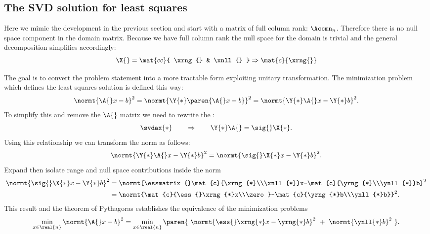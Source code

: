 \documentclass[10pt]{newsiambook}
\begin{document}
\subsection{The SVD solution for least squares}
Here we mimic the development in the previous section and start with a matrix of full column rank: $\Accmn_{n}$. Therefore there is no null space component in the domain matrix. Because we have full column rank the null space for the domain is trivial and the general decomposition simplifies accordingly:
\begin{equation}
  \X{} = \mat{cc}{ \xrng{} & \xnll{} } \Rightarrow \mat{c}{ \xrng{} }
\end{equation}

The goal is to convert the problem statement into a more tractable form exploiting unitary transformation. The minimization problem which defines the least squares solution is defined this way:
\begin{equation}
  \normt{\A{}x-b}^{2} = \normt{\Y{*}\paren{ \A{}x-b }}^{2} = \normt{\Y{*}\A{}x-\Y{*}b}^{2}.
\end{equation}
To simplify this and remove the $\A{}$ matrix we need to rewrite the \svdl:
\begin{equation}
  \svdax{*} \qquad \Rightarrow \qquad \Y{*}\A{} = \sig{}\X{*}.
\end{equation}
Using this relationship we can transform the norm as follows:
\begin{equation}
  \normt{\Y{*}\A{}x-\Y{*}b}^{2} = \normt{\sig{}\X{*}x-\Y{*}b}^{2}.
\end{equation}
%
Expand then isolate range and null space contributions inside the norm
\begin{equation}
\begin{split}
  \normt{\sig{}\X{*}x-\Y{*}b}^{2} 
    &= \normt{\essmatrix{}\mat{c}{\xrng{*}\\\xnll{*}}x-\mat{c}{\yrng{*}\\\ynll{*}}b}^{2} \\
    &= \normt{\mat{c}{\ess{}\xrng{*}x\\\zero}-\mat{c}{\yrng{*}b\\\ynll{*}b}}^{2}.
\end{split}
\end{equation}
%
This result and the theorem of Pythagoras establishes the equivalence of the minimization problems
\begin{equation}
  \min\limits_{x\in\real{n}} \normt{\A{}x-b}^{2} = \min\limits_{x\in\real{n}} \paren{\ \normt{\ess{}\xrng{*}x - \yrng{*}b}^{2}\ +\ \normt{\ynll{*}b}^{2}\ }.
\end{equation}
\end{document}
